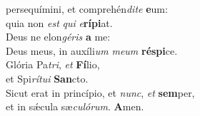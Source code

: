 \evenverse  persequímini, et comprehén\textit{di}\textit{te} \textbf{e}um:~\*\\
\evenverse quia non \textit{est} \textit{qui} \textit{e}\textbf{rí}\textbf{pi}at.\\
\oddverse Deus ne elon\textit{gé}\textit{ris} \textbf{a} me:~\*\\
\oddverse Deus meus, in auxíli\textit{um} \textit{me}\textit{um} \textbf{ré}\textbf{spi}ce.\\
\evenverse Glória Pa\textit{tri}, \textit{et} \textbf{Fí}lio,~\*\\
\evenverse et Spi\textit{rí}\textit{tu}\textit{i} \textbf{San}cto.\\
\oddverse Sicut erat in princípio, et \textit{nunc}, \textit{et} \textbf{sem}per,~\*\\
\oddverse et in sǽcula sæ\textit{cu}\textit{ló}\textit{rum}. \textbf{A}men.\\
